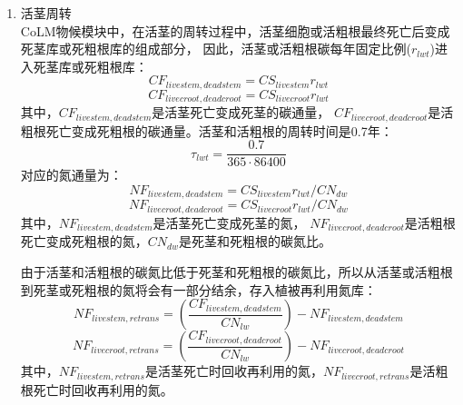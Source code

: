 \begin{enumerate}
\item 活茎周转\\
CoLM物候模块中，在活茎的周转过程中，活茎细胞或活粗根最终死亡后变成死茎库或死粗根库的组成部分，
因此，活茎或活粗根碳每年固定比例($r_{lwt}$)进入死茎库或死粗根库：
\begin{equation}
CF_{ {livestem,deadstem }}=CS_{ {livestem }} r_{l w t}
\end{equation}
\begin{equation}
CF_{ {livecroot,deadcroot }}=CS_{ {livecroot }} r_{ {lwt }}
\end{equation}
其中，$CF_{livestem,deadstem}$是活茎死亡变成死茎的碳通量，
$CF_{livecroot,deadcroot}$是活粗根死亡变成死粗根的碳通量。活茎和活粗根的周转时间是0.7年：
\begin{equation}
  \tau_{l w t}=\frac{0.7}{365 \cdot 86400}
  \end{equation}
  对应的氮通量为：
  \begin{equation}
N F_{livestem,deadstem}=CS_{livestem} r_{l w t} / CN_{d w}
\end{equation}
\begin{equation}
N F_{livecroot,deadcroot}=CS_{livecroot} r_{lwt} / CN_{d w}
\end{equation}
其中，$NF_{livestem,deadstem}$是活茎死亡变成死茎的氮，
$NF_{livecroot,deadcroot}$是活粗根死亡变成死粗根的氮，$CN_{dw}$是死茎和死粗根的碳氮比。

由于活茎和活粗根的碳氮比低于死茎和死粗根的碳氮比，所以从活茎或活粗根到死茎或死粗根的氮将会有一部分结余，存入植被再利用氮库：
\begin{equation}
N F_{ {livestem,retrans }}=\left(\frac{CF_{ {livestem,deadstem }}}{CN_{lw}}\right)-N F_{ {livestem,deadstem }}
\end{equation}
\begin{equation}
N F_{ {livecroot,retrans }}=\left(\frac{CF_{ {livecroot,deadcroot }}}{CN_{lw}}\right)-N F_{ {livecroot,deadcroot }}
\end{equation}
其中，$NF_{livestem,retrans}$是活茎死亡时回收再利用的氮，$NF_{livecroot,retrans}$是活粗根死亡时回收再利用的氮。

\end{enumerate}


